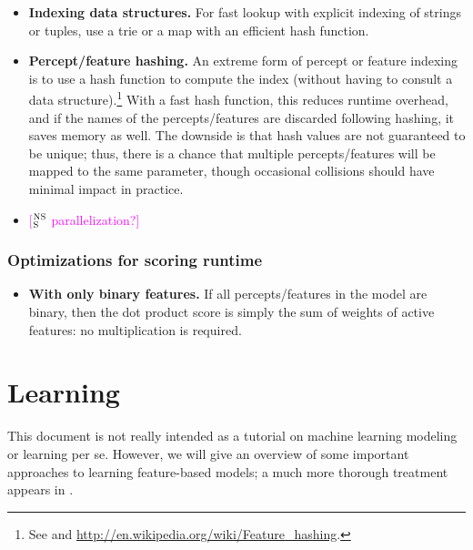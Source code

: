 \documentclass[11pt,letterpaper]{article}
\newcommand{\ensuretext}[1]{#1}
\newcommand{\nssmarker}{\ensuretext{\textcolor{magenta}{\ensuremath{^{\textsc{NS}}_{\textsc{S}}}}}}
\newcommand{\arkcomment}[3]{\ensuretext{\textcolor{#3}{[#1 #2]}}}
\newcommand{\nss}[1]{\arkcomment{\nssmarker}{#1}{magenta}}
\begin{document}
\begin{itemize}
  \item \textbf{Indexing data structures.} For fast lookup with explicit indexing of strings or tuples, 
use a trie or a map with an efficient hash function.

  \item \textbf{Percept/feature hashing.} An extreme form of percept or feature indexing is to use a hash function to compute the index 
(without having to consult a data structure).\footnote{See \citep{weinberger-09} and \url{http://en.wikipedia.org/wiki/Feature_hashing}.}
With a fast hash function, this reduces runtime overhead, 
and if the names of the percepts\slash features are discarded following hashing, it saves memory as well.
The downside is that hash values are not guaranteed to be unique; 
thus, there is a chance that multiple percepts\slash features will 
be mapped to the same parameter, though occasional collisions should have minimal impact in practice. 

  \item \nss{parallelization?}
\end{itemize}

\subsubsection{Optimizations for scoring runtime}

\begin{itemize}
\item \textbf{With only binary features.} If all percepts\slash features in the model are binary, 
then the dot product score is simply the sum of weights of active features: no multiplication is required.
\end{itemize}



\section{Learning}\label{sec:learning}

This document is not really intended as a tutorial on machine learning modeling or learning per se. 
However, we will give an overview of some important approaches to learning feature-based models; 
a much more thorough treatment appears in \citet{smith}. 
\end{document}
